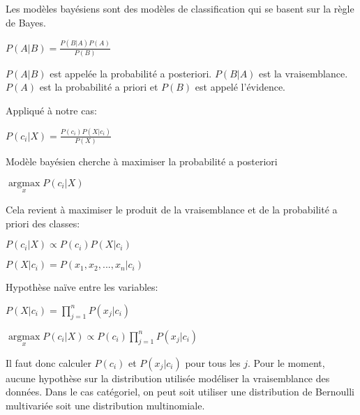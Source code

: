 Les modèles bayésiens sont des modèles de classification qui se basent sur la règle de Bayes. 
\begin{center}$P(A | B) = \frac{P(B | A) P(A)}{P(B)}$
\end{center}

$P(A | B)$ est appelée la probabilité a posteriori. $P(B | A)$ est la vraisemblance. $P(A)$ est la probabilité a priori et $P(B)$ est appelé l'évidence.

Appliqué à notre cas:

$P(c_{i} | X) = \frac{P(c_{i}) P(X | c_{i})}{P(X)}$

Modèle bayésien cherche à maximiser la probabilité a posteriori

$ \underset{x}{\operatorname{argmax}} P(c_{i} | X)$

Cela revient à maximiser le produit de la vraisemblance et de la probabilité a priori des classes:

$P(c_{i} | X) \propto P(c_{i}) P(X | c_{i})$

$P(X | c_{i}) = P(x_{1}, x_{2}, ..., x_{n} | c_{i})$

Hypothèse naïve entre les variables:

$\displaystyle P(X | c_{i}) = \prod_{j=1}^{n} P(x_{j} | c_{i})$


$ \underset{x}{\operatorname{argmax}} P(c_{i} | X) \propto P(c_{i}) \displaystyle \prod_{j=1}^{n} P(x_{j} | c_{i}) $

Il faut donc calculer $P(c_{i})$ et $P(x_{j} | c_{i})$ pour tous les $j$.
Pour le moment, aucune hypothèse sur la distribution utilisée modéliser la vraisemblance des données. Dans le cas catégoriel, on peut soit utiliser une distribution de Bernoulli multivariée soit une distribution multinomiale.